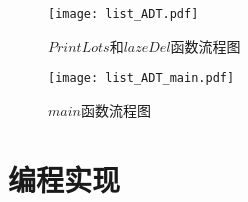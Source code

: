 \documentclass[UTF8]{ctexart}
\begin{document}
\begin{figure}[H]
	\centering 
	\texttt{[image: list\_ADT.pdf]} 
	\caption{$PrintLots$和$lazeDel$函数流程图} 
	\label{PrintsLots_and_lazeDel}
\end{figure}



\begin{figure}[H]
	\centering 
	\texttt{[image: list\_ADT\_main.pdf]} 
	\caption{$main$函数流程图} 
	\label{main}
\end{figure}
\newpage



	\section{编程实现\protect \footnotemark[1]}
\end{document}
